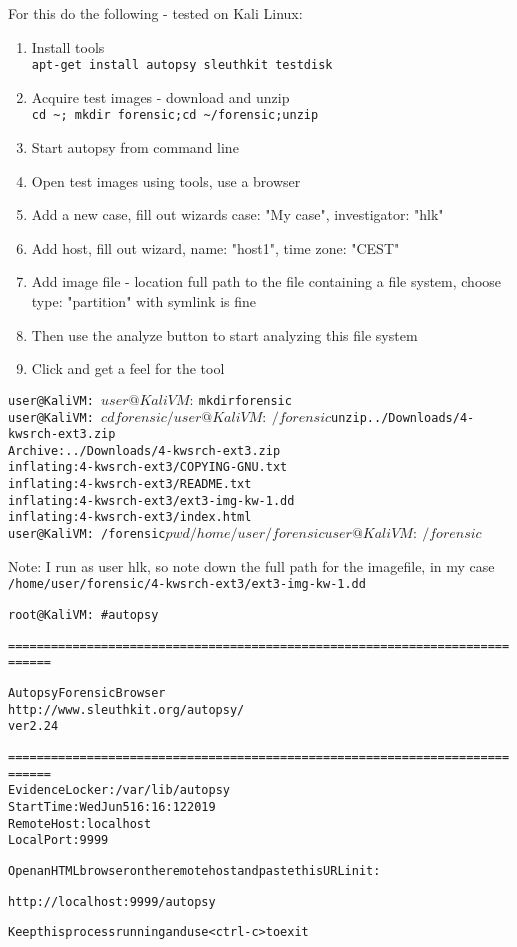 \documentclass[a4paper,11pt,notitlepage]{report}
\begin{document}
For this do the following - tested on Kali Linux:
\begin{enumerate}
\item Install tools\\
\verb+apt-get install autopsy sleuthkit testdisk+
\item Acquire test images - download and unzip\\
\verb+cd ~; mkdir forensic;cd ~/forensic;unzip  +
\item Start autopsy from command line
\item Open test images using tools, use a browser 
\item Add a new case, fill out wizards case: "My case", investigator: "hlk"
\item Add host, fill out wizard, name: "host1", time zone: "CEST"
\item Add image file - location full path to the file containing a file system, choose type: "partition" with symlink is fine
\item Then use the analyze button to start analyzing this file system
\item Click and get a feel for the tool
\end{enumerate}

\begin{alltt}
user@KaliVM:~$
user@KaliVM:~$ mkdir forensic
user@KaliVM:~$ cd forensic/
user@KaliVM:~/forensic$ unzip ../Downloads/4-kwsrch-ext3.zip
Archive:  ../Downloads/4-kwsrch-ext3.zip
  inflating: 4-kwsrch-ext3/COPYING-GNU.txt
  inflating: 4-kwsrch-ext3/README.txt
  inflating: 4-kwsrch-ext3/ext3-img-kw-1.dd
  inflating: 4-kwsrch-ext3/index.html
user@KaliVM:~/forensic$ pwd
/home/user/forensic
user@KaliVM:~/forensic$
\end{alltt}

Note: I run as user hlk, so note down the full path for the imagefile, in my case \verb+/home/user/forensic/4-kwsrch-ext3/ext3-img-kw-1.dd+


\begin{alltt}
root@KaliVM:~# autopsy

============================================================================

                       Autopsy Forensic Browser
                  http://www.sleuthkit.org/autopsy/
                             ver 2.24

============================================================================
Evidence Locker: /var/lib/autopsy
Start Time: Wed Jun  5 16:16:12 2019
Remote Host: localhost
Local Port: 9999

Open an HTML browser on the remote host and paste this URL in it:

    http://localhost:9999/autopsy

Keep this process running and use <ctrl-c> to exit
\end{alltt}
\end{document}
